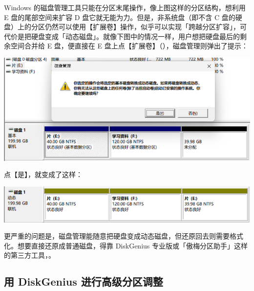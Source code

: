 {\begin{warning}
  Windows 的磁盘管理工具只能在分区末尾操作，像上图这样的分区结构，想利用 E 盘的尾部空间来扩容 D 盘它就无能为力。但是，非系统盘（即不含 C 盘的硬盘）上的分区仍然可以使用【扩展卷】操作，似乎可以实现「跨越分区扩容」，可代价是把硬盘变成「动态磁盘」。就像下图中的情况一样，用户想把硬盘最后的剩余空间合并给 E 盘，便直接在 E 盘上点【扩展卷】（），磁盘管理则弹出了提示：

  \begin{center}
    \includegraphics[width=.8\textwidth]{assets/advanced/Converting_to_Dynamic_Disk.png}
    \label{fig:Converting_to_Dynamic_Disk}
  \end{center}

  点【是】，就变成了这样：

  \begin{center}
    \includegraphics[width=.8\textwidth]{assets/advanced/Dynamic_Disk.png}
    \label{fig:Dynamic_Disk}
  \end{center}

  更严重的问题是，磁盘管理能随意把硬盘变成动态磁盘，但还原回去则需要格式化。想要直接还原成普通磁盘，得靠 DiskGenius 专业版或「傲梅分区助手」\footnotemark 这样的第三方工具，。
\end{warning}


\subsection{用 DiskGenius 进行高级分区调整}

}
